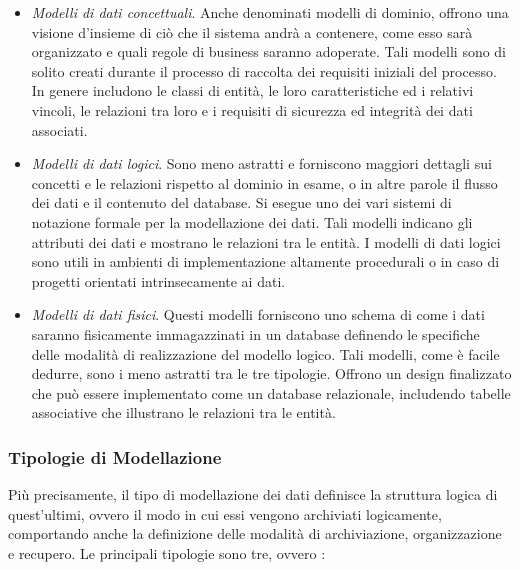 \begin{itemize}
    \item \textit{Modelli di dati concettuali}. Anche denominati modelli di dominio, offrono una visione d'insieme di ciò che il sistema andrà a contenere, come esso sarà organizzato e quali regole di business saranno adoperate. Tali modelli sono di solito creati durante il processo di raccolta dei requisiti iniziali del processo. In genere includono le classi di entità, le loro caratteristiche ed i relativi vincoli, le relazioni tra loro e i requisiti di sicurezza ed integrità dei dati associati.
    \item \textit{Modelli di dati logici}. Sono meno astratti e forniscono maggiori dettagli sui concetti e le relazioni rispetto al dominio in esame, o in altre parole il flusso dei dati e il contenuto del database. Si esegue uno dei vari sistemi di notazione formale per la modellazione dei dati. Tali modelli indicano gli attributi dei dati e mostrano le relazioni tra le entità. I modelli di dati logici sono utili in ambienti di implementazione altamente procedurali o in caso di progetti orientati intrinsecamente ai dati.
    \item \textit{Modelli di dati fisici}. Questi modelli forniscono uno schema di come i dati saranno fisicamente immagazzinati in un database definendo le specifiche delle modalità di realizzazione del modello logico. Tali modelli, come è facile dedurre, sono i meno astratti tra le tre tipologie. Offrono un design finalizzato che può essere implementato come un database relazionale, includendo tabelle associative che illustrano le relazioni tra le entità.
\end{itemize}

\subsubsection{Tipologie di Modellazione}

Più precisamente, il tipo di modellazione dei dati definisce la struttura logica di quest'ultimi, ovvero il modo in cui essi vengono archiviati logicamente, comportando anche la definizione delle modalità di archiviazione, organizzazione e recupero. Le principali tipologie sono tre, ovvero \cite{sap_data_modeling}:

